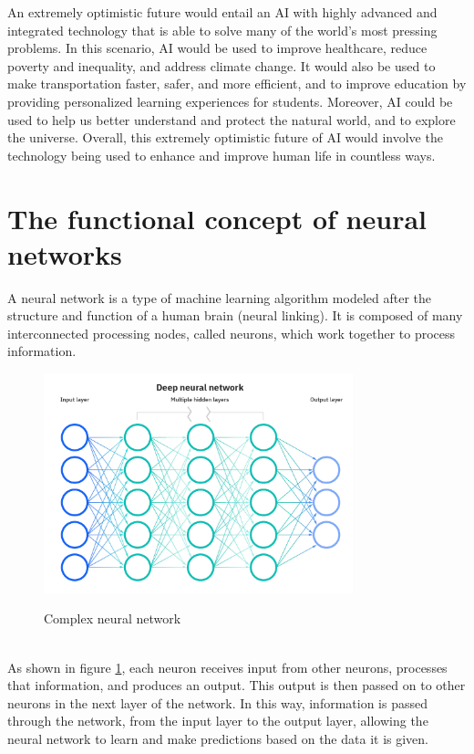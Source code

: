 An extremely optimistic future would entail an AI with highly advanced and 
integrated technology that is able to solve many of the world's most pressing 
problems. In this scenario, AI would be used to improve healthcare, reduce poverty 
and inequality, and address climate change. It would also be used to make transportation 
faster, safer, and more efficient, and to improve education by providing personalized learning 
experiences for students. Moreover, AI could be used to help us better understand and protect the 
natural world, and to explore the universe. Overall, this extremely optimistic future of AI would 
involve the technology being used to enhance and improve human life in countless ways.



\section{The functional concept of neural networks}
A neural network is a type of machine learning algorithm modeled 
after the structure and function of a human brain (neural linking). 
It is composed of many interconnected processing nodes, called neurons, 
which work together to process information. 
\\
\begin{figure}[htb]
    \centering
    \includegraphics[width=0.8\textwidth]{pics/neuralnetwork.jpg}
    \caption{Complex neural network}
    \label{fig:neuralnetwork}
    \cite{IBM}
\end{figure}
\\
As shown in figure \ref{fig:neuralnetwork}, each neuron receives input from other neurons, processes that information, 
and produces an output. This output is then passed on to other neurons in the next 
layer of the network. In this way, information is passed through the network, from the 
input layer to the output layer, allowing the neural network to learn and make predictions
based on the data it is given. \cite{book1}


